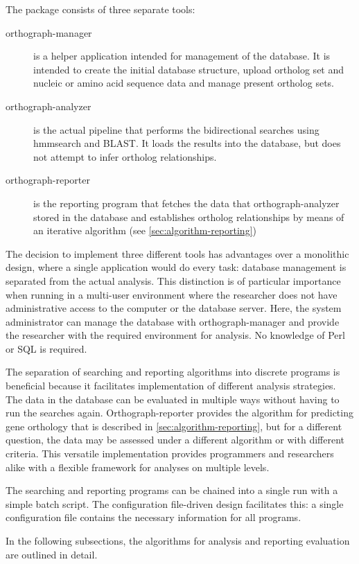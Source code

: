 \label{sec:algorithm}
The \pname package consists of three separate tools:

\begin{description}
	\item[orthograph-manager] is a helper application intended for management of
		the database. It is intended to create the initial database structure, upload
		ortholog set and nucleic or amino acid sequence data and manage present
		ortholog sets.
	\item[orthograph-analyzer] is the actual pipeline that performs the
		bidirectional searches using hmmsearch and BLAST. It loads the results into
		the database, but does not attempt to infer ortholog relationships. 
	\item[orthograph-reporter] is the reporting program that fetches the data that
		orthograph-analyzer stored in the database and establishes ortholog
		relationships by means of an iterative algorithm (see
		\autoref{sec:algorithm-reporting})
\end{description}

The decision to implement three different tools  has advantages over a
monolithic design, where a single application would do every task: database
management is separated from the actual analysis. This distinction is of
particular importance when running \pname in a multi-user environment where the
researcher does not have administrative access to the computer or the database
server. Here, the system administrator can manage the database with
orthograph-manager and provide the researcher with the required environment for
analysis. No knowledge of Perl or SQL is required.

The separation of searching and reporting algorithms into discrete programs is
beneficial because it facilitates implementation of different analysis
strategies. The data in the database can be evaluated in multiple ways without
having to run the searches again. Orthograph-reporter provides the algorithm for
predicting gene orthology that is described in
\autoref{sec:algorithm-reporting}, but for a different question, the data may be
assessed under a different algorithm or with different criteria. This versatile
implementation provides programmers and researchers alike with a flexible
framework for analyses on multiple levels. 

The searching and reporting programs can be chained into a single run
with a simple batch script. The configuration file-driven design facilitates
this: a single configuration file contains the necessary information for all
\pname programs.

In the following subsections, the algorithms for analysis and reporting
evaluation are outlined in detail.
